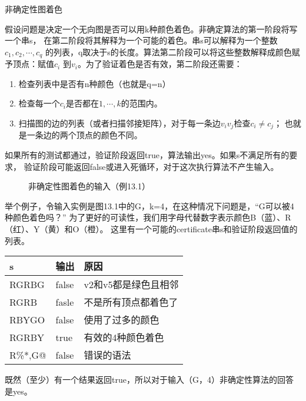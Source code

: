 \begin{example}
非确定性图着色

假设问题是决定一个无向图是否可以用k种颜色着色。非确定算法的第一阶段将写一个串s，
在第二阶段将其解释为一个可能的着色。串s可以解释为一个整数$c_1,c_2, \cdots,c_q$
的列表，q取决于s的长度。算法第二阶段可以将这些整数解释成颜色赋予顶点：赋值$c_i$
到$v_i$。为了验证着色是否有效，第二阶段还需要：
\begin{enumerate}
\item 检查列表中是否有n种颜色（也就是q=n）
\item 检查每一个$c_i$是否都在$1, \cdots, k$的范围内。
\item 扫描图的边的列表（或者扫描邻接矩阵），对于每一条边$v_iv_j$检查$c_i\neq c_j$；
    也就是一条边的两个顶点的颜色不同。
\end{enumerate}
如果所有的测试都通过，验证阶段返回true，算法输出yes。如果s不满足所有的要求，
验证阶段可能返回false或进入死循环，对于这次执行算法不产生输入。

\begin{figure*}[!t]
    \centering
    \caption{非确定性图着色的输入（例13.1）}
    \label{Fig:Under}
\end{figure*}

举个例子，令输入实例是图13.1中的G，k=4，在这种情况下问题是，“G可以被4种颜色着色吗？”
为了更好的可读性，我们用字母代替数字表示颜色B（蓝）、R（红）、Y（黄）和O（橙）。
这里有一个可能的certificate串s和验证阶段返回值的列表。

\begin{tabular}{lll}
    \hline
    s       &输出    &原因\\
    \hline
    RGRBG   &false   &v2和v5都是绿色且相邻\\
    RGRB    &fasle   &不是所有顶点都着色了\\
    RBYGO   &false   &使用了过多的颜色\\
    RGRBY   &true    &有效的4种颜色着色\\
    R\%*,G@  &false   &错误的语法\\
    \hline
\end{tabular}

既然（至少）有一个结果返回true，所以对于输入（G，4）非确定性算法的回答是yes。

\end{example}

